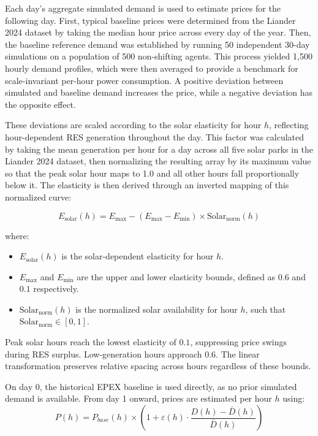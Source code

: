 \documentclass[11pt, a4paper]{article}
\begin{document}
Each day's aggregate simulated demand is used to estimate prices for the following day. First, typical baseline prices were determined from the Liander 2024 dataset by taking the median hour price across every day of the year. Then, the baseline reference demand was established by running 50 independent 30-day simulations on a population of 500 non-shifting agents. This process yielded 1,500 hourly demand profiles, which were then averaged to provide a benchmark for scale-invariant per-hour power consumption. A positive deviation between simulated and baseline demand increases the price, while a negative deviation has the opposite effect. 

These deviations are scaled according to the solar elasticity for hour $h$, reflecting hour-dependent RES generation throughout the day. This factor was calculated by taking the mean generation per hour for a day across all five solar parks in the Liander 2024 dataset, then normalizing the resulting array by its maximum value so that the peak solar hour maps to 1.0 and all other hours fall proportionally below it. The elasticity is then derived through an inverted mapping of this normalized curve:

\begin{equation}
    E_{\text{solar}}(h) = E_{\text{max}} - (E_{\text{max}} - E_{\text{min}}) \times \text{Solar}_{\text{norm}}(h)
\end{equation}

\noindent where:
\begin{itemize}
    \item $E_{\text{solar}}(h)$ is the solar-dependent elasticity for hour $h$.
    \item $E_{\text{max}}$ and $E_{\text{min}}$ are the upper and lower elasticity bounds, defined as $0.6$ and $0.1$ respectively.
    \item $\text{Solar}_{\text{norm}}(h)$ is the normalized solar availability for hour $h$, such that $\text{Solar}_{\text{norm}} \in [0, 1]$.
\end{itemize}

Peak solar hours reach the lowest elasticity of $0.1$, suppressing price swings during RES surplus. Low-generation hours approach $0.6$. The linear transformation preserves relative spacing across hours regardless of these bounds.


On day 0, the historical EPEX baseline is used directly, as no prior simulated demand is available. From day 1 onward, prices are estimated per hour $h$ using:
\begin{equation}
    P(h) = P_{base}(h) \times \left( 1 + \varepsilon(h) \cdot \frac{D(h) - \bar{D}(h)}{\bar{D}(h)} \right)
\end{equation}
\end{document}
